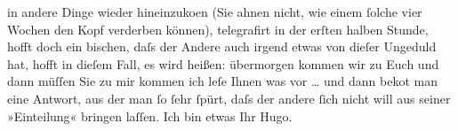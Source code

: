                     in andere Dinge wieder hineinzuko{\geminationm}en (Sie ahnen
                    nicht, wie einem ſolche vier Wochen den Kopf verderben können), telegrafirt {\pb}in der erſten halben Stunde,
                    hofft doch ein bischen, daſs der Andere auch irgend etwas von dieſer Ungeduld
                    hat, hofft in dieſem Fall, es wird heißen: übermorgen kommen wir zu Euch und
                    dann müſſen Sie zu mir kommen ich leſe Ihnen was vor {\dots} und dann beko{\geminationm}t man eine Antwort, aus der man ſo
                    ſehr ſpürt, daſs der andere ſich nicht will aus seiner »Einteilung« bringen
                    laſſen. Ich bin etwas \label{T_L01539_1v}\label{T_L01539_1h}\pend
           \pstart Ihr \spacefill\mbox{Hugo.}\pend{}\endnumbering{}  
      